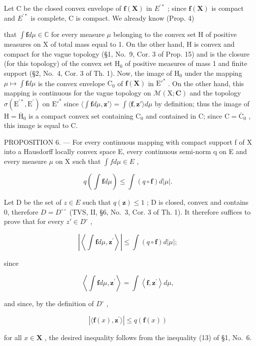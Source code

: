 Let C be the closed convex envelope of \(\mathbf{f}(\mathbf{X})\) in \(E^{\prime*}\) ; since \(\mathbf{f}(\mathbf{X})\) is compact and \(E^{\prime*}\) is complete, C is compact. We already know (Prop. 4)

that \(\int \mathbf{f}d\mu \in \mathbb{C}\) for every measure \(\mu\) belonging to the convex set H of positive measures on X of total mass equal to 1. On the other hand, H is convex and compact for the vague topology (§1, No.~9, Cor. 3 of Prop. 15) and is the closure (for this topology) of the convex set \(\mathrm{H}_0\) of positive measures of mass 1 and finite support (§2, No.~4, Cor. 3 of Th. 1). Now, the image of \(\mathrm{H}_0\) under the mapping \(\mu \mapsto \int \mathbf{f}d\mu\) is the convex envelope \(\mathrm{C}_0\) of \(\mathbf{f}(\mathbf{X})\) in \(\mathrm{E}'^*\) . On the other hand, this mapping is continuous for the vague topology on \(\mathcal{M}(\mathrm{X};\mathbf{C})\) and the topology \(\sigma (\mathrm{E}^{\prime *},\mathrm{E}^{\prime})\) on \(\mathrm{E}'^*\) since \(\langle \int \mathbf{f}d\mu ,\mathbf{z}'\rangle = \int \langle \mathbf{f},\mathbf{z}'\rangle d\mu\) by definition; thus the image of \(\mathrm{H} = \overline{\mathrm{H}}_0\) is a compact convex set containing \(\mathrm{C}_0\) and contained in C; since \(\mathrm{C} = \overline{\mathrm{C}}_0\) , this image is equal to C.

PROPOSITION 6. --- For every continuous mapping with compact support f of X into a Hausdorff locally convex space E, every continuous semi-norm q on E and every measure \(\mu\) on X such that \(\int f d\mu \in E\) ,

\[
q \left(\int \mathbf {f} d \mu\right) \leqslant \int (q \circ \mathbf {f}) d | \mu |.\tag{4}
\]

Let D be the set of \(z \in E\) such that \(q(\mathbf{z}) \leqslant 1\) ; D is closed, convex and contains 0, therefore \(D = D^{\circ\circ}\) (TVS, II, §6, No.~3, Cor. 3 of Th. 1). It therefore suffices to prove that for every \(z' \in D^{\circ}\) ,

\[
\left| \left\langle \int \mathbf {f} d \mu , \mathbf {z} ^ {\prime} \right\rangle \right| \leqslant \int (q \circ \mathbf {f}) d | \mu |;
\]

since

\[
\left\langle \int \mathbf {f} d \mu , \mathbf {z} ^ {\prime} \right\rangle = \int \left\langle \mathbf {f}, \mathbf {z} ^ {\prime} \right\rangle d \mu ,
\]

and since, by the definition of \(D^{\circ}\) ,

\[
| \langle \mathbf {f} (x), \mathbf {z} ^ {\prime} \rangle | \leqslant q (\mathbf {f} (x))
\]

for all \(x \in \mathbf{X}\) , the desired inequality follows from the inequality (13) of §1, No.~6.

